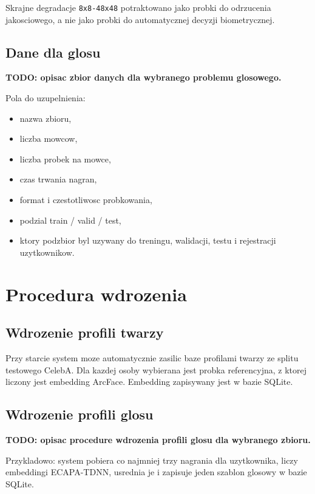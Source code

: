 \documentclass[12pt]{article}
\begin{document}
Skrajne degradacje \texttt{8x8-48x48} potraktowano jako probki do odrzucenia jakosciowego, a nie jako probki do automatycznej decyzji biometrycznej.

\subsection{Dane dla glosu}

\textbf{TODO: opisac zbior danych dla wybranego problemu glosowego.}

Pola do uzupelnienia:

\begin{itemize}
    \item nazwa zbioru,
    \item liczba mowcow,
    \item liczba probek na mowce,
    \item czas trwania nagran,
    \item format i czestotliwosc probkowania,
    \item podzial train / valid / test,
    \item ktory podzbior byl uzywany do treningu, walidacji, testu i rejestracji uzytkownikow.
\end{itemize}

\section{Procedura wdrozenia}

\subsection{Wdrozenie profili twarzy}

Przy starcie system moze automatycznie zasilic baze profilami twarzy ze splitu testowego CelebA. Dla kazdej osoby wybierana jest probka referencyjna, z ktorej liczony jest embedding ArcFace. Embedding zapisywany jest w bazie SQLite.

\subsection{Wdrozenie profili glosu}

\textbf{TODO: opisac procedure wdrozenia profili glosu dla wybranego zbioru.}

Przykladowo: system pobiera co najmniej trzy nagrania dla uzytkownika, liczy embeddingi ECAPA-TDNN, usrednia je i zapisuje jeden szablon glosowy w bazie SQLite.
\end{document}
